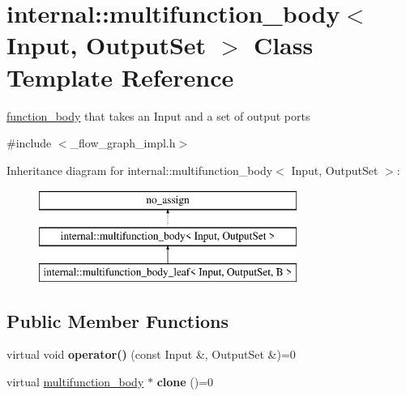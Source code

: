\hypertarget{classinternal_1_1multifunction__body}{}\section{internal\+:\+:multifunction\+\_\+body$<$ Input, Output\+Set $>$ Class Template Reference}
\label{classinternal_1_1multifunction__body}


\hyperlink{classinternal_1_1function__body}{function\+\_\+body} that takes an Input and a set of output ports  




{\ttfamily \#include $<$\+\_\+flow\+\_\+graph\+\_\+impl.\+h$>$}

Inheritance diagram for internal\+:\+:multifunction\+\_\+body$<$ Input, Output\+Set $>$\+:\begin{figure}[H]
\begin{center}
\leavevmode
\includegraphics[height=3.000000cm]{classinternal_1_1multifunction__body}
\end{center}
\end{figure}
\subsection*{Public Member Functions}
\begin{DoxyCompactItemize}
\item 
\hypertarget{classinternal_1_1multifunction__body_ae9753dcbdf4153804aebd014c79bf1fd}{}virtual void {\bfseries operator()} (const Input \&, Output\+Set \&)=0\label{classinternal_1_1multifunction__body_ae9753dcbdf4153804aebd014c79bf1fd}

\item 
\hypertarget{classinternal_1_1multifunction__body_aff47b95e9200427fda77f67949bfdd45}{}virtual \hyperlink{classinternal_1_1multifunction__body}{multifunction\+\_\+body} $\ast$ {\bfseries clone} ()=0\label{classinternal_1_1multifunction__body_aff47b95e9200427fda77f67949bfdd45}

\end{DoxyCompactItemize}


